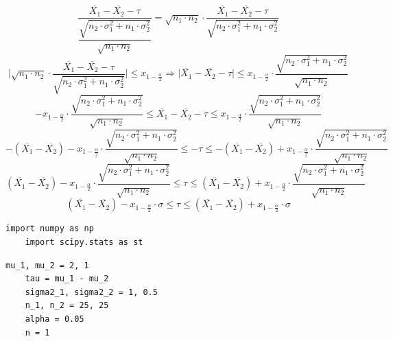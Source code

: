 \documentclass[a4paper, 12pt]{article}
\begin{document}
    $$\dfrac{\overline{X_1}-\overline{X_2}-\tau}{\dfrac{\sqrt{n_2\cdot\sigma_1^2+n_1\cdot\sigma_2^2}}{\sqrt{n_1\cdot n_2}}}=\sqrt{n_1\cdot n_2}\cdot\dfrac{\overline{X_1}-\overline{X_2}-\tau}{\sqrt{n_2\cdot\sigma_1^2+n_1\cdot\sigma_2^2}}$$
    $$\Bigg|\sqrt{n_1\cdot n_2}\cdot\dfrac{\overline{X_1}-\overline{X_2}-\tau}{\sqrt{n_2\cdot\sigma_1^2+n_1\cdot\sigma_2^2}}\Bigg|\leq x_{1-\frac{\alpha}{2}}\Rightarrow
    \Bigg|\overline{X_1}-\overline{X_2}-\tau\Bigg|\leq x_{1-\frac{\alpha}{2}}\cdot\dfrac{\sqrt{n_2\cdot\sigma_1^2+n_1\cdot\sigma_2^2}}{\sqrt{n_1\cdot n_2}}$$
    $$-x_{1-\frac{\alpha}{2}}\cdot\dfrac{\sqrt{n_2\cdot\sigma_1^2+n_1\cdot\sigma_2^2}}{\sqrt{n_1\cdot n_2}}\leq\overline{X_1}-\overline{X_2}-\tau\leq x_{1-\frac{\alpha}{2}}\cdot\dfrac{\sqrt{n_2\cdot\sigma_1^2+n_1\cdot\sigma_2^2}}{\sqrt{n_1\cdot n_2}}$$
    $$-\left(\overline{X_1}-\overline{X_2}\right)-x_{1-\frac{\alpha}{2}}\cdot\dfrac{\sqrt{n_2\cdot\sigma_1^2+n_1\cdot\sigma_2^2}}{\sqrt{n_1\cdot n_2}}\leq-\tau\leq -\left(\overline{X_1}-\overline{X_2}\right)+x_{1-\frac{\alpha}{2}}\cdot\dfrac{\sqrt{n_2\cdot\sigma_1^2+n_1\cdot\sigma_2^2}}{\sqrt{n_1\cdot n_2}}$$
    $$\left(\overline{X_1}-\overline{X_2}\right)-x_{1-\frac{\alpha}{2}}\cdot\dfrac{\sqrt{n_2\cdot\sigma_1^2+n_1\cdot\sigma_2^2}}{\sqrt{n_1\cdot n_2}}\leq\tau\leq \left(\overline{X_1}-\overline{X_2}\right)+x_{1-\frac{\alpha}{2}}\cdot\dfrac{\sqrt{n_2\cdot\sigma_1^2+n_1\cdot\sigma_2^2}}{\sqrt{n_1\cdot n_2}}$$
    $$\left(\overline{X_1}-\overline{X_2}\right)-x_{1-\frac{\alpha}{2}}\cdot\sigma\leq\tau\leq \left(\overline{X_1}-\overline{X_2}\right)+x_{1-\frac{\alpha}{2}}\cdot\sigma$$


    \begin{lstlisting}[label=imps1, caption={import}]
    import numpy as np
    import scipy.stats as st
    \end{lstlisting}


    \begin{lstlisting}[label=vars, caption={Задаем данные по условию}]
    mu_1, mu_2 = 2, 1
    tau = mu_1 - mu_2
    sigma2_1, sigma2_2 = 1, 0.5
    n_1, n_2 = 25, 25
    alpha = 0.05
    n = 1
    \end{lstlisting}
\end{document}
